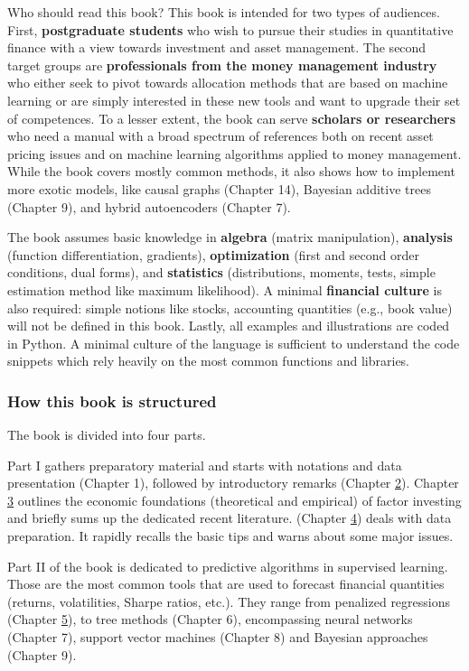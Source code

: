 Who should read this book? This book is intended for two types of audiences. First, \textbf{postgraduate students} who wish to pursue their studies in quantitative finance with a view towards investment and asset management. The second target groups are \textbf{professionals from the money management industry} who either seek to pivot towards allocation methods that are based on machine learning or are simply interested in these new tools and want to upgrade their set of competences. To a lesser extent, the book can serve \textbf{scholars or researchers} who need a manual with a broad spectrum of references both on recent asset pricing issues and on machine learning algorithms applied to money management. While the book covers mostly common methods, it also shows how to implement more exotic models, like causal graphs (Chapter 14), Bayesian additive trees (Chapter 9), and hybrid autoencoders (Chapter 7).

The book assumes basic knowledge in \textbf{algebra} (matrix manipulation), \textbf{analysis} (function differentiation, gradients), \textbf{optimization} (first and second order conditions, dual forms), and \textbf{statistics} (distributions, moments, tests, simple estimation method like maximum likelihood). A minimal \textbf{financial culture} is also required: simple notions like stocks, accounting quantities (e.g., book value) will not be defined in this book. Lastly, all examples and illustrations are coded in Python. A minimal culture of the language is sufficient to understand the code snippets which rely heavily on the most common functions and libraries.

\subsubsection{How this book is structured}

The book is divided into four parts.

Part I gathers preparatory material and starts with notations and data presentation (Chapter 1), followed by introductory remarks (Chapter \href{/chap-02-introduction}{2}). Chapter \href{/chap-03-asset-pricing}{3} outlines the economic foundations (theoretical and empirical) of factor investing and briefly sums up the dedicated recent literature. (Chapter \href{/chap-05-data-processing}{4}) deals with data preparation. It rapidly recalls the basic tips and warns about some major issues.

Part II of the book is dedicated to predictive algorithms in supervised learning. Those are the most common tools that are used to forecast financial quantities (returns, volatilities, Sharpe ratios, etc.). They range from penalized regressions (Chapter \href{/chap-06-lasso}{5}), to tree methods (Chapter 6), encompassing neural networks (Chapter 7), support vector machines (Chapter 8) and Bayesian approaches (Chapter 9).

